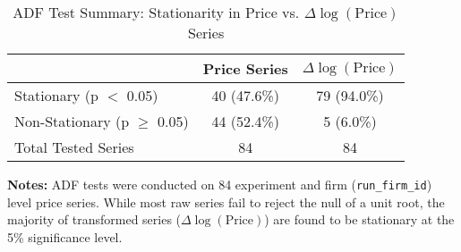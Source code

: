 \begin{table}[H]
    \centering
    \caption{ADF Test Summary: Stationarity in Price vs. $\Delta \log(\text{Price})$ Series}
    \label{tab:adf_comparison}
    \begin{threeparttable}
    \begin{tabular}{lcc}
    \toprule
    & Price Series & $\Delta \log(\text{Price})$ \\
    \midrule
    Stationary (p $<$ 0.05)     & 40 (47.6\%)  & 79 (94.0\%) \\
    Non-Stationary (p $\geq$ 0.05) & 44 (52.4\%)  & 5 (6.0\%) \\
    \midrule
    Total Tested Series         & 84           & 84 \\
    \bottomrule
    \end{tabular}
    \begin{tablenotes}[flushleft]
    \footnotesize
    \item \textbf{Notes:} ADF tests were conducted on 84  experiment and firm (\texttt{run\_firm\_id}) level price series. While most raw series fail to reject the null of a unit root, the majority of transformed series ($\Delta \log(\text{Price})$) are found to be stationary at the 5\% significance level.
    \end{tablenotes}
    \end{threeparttable}
\end{table}




